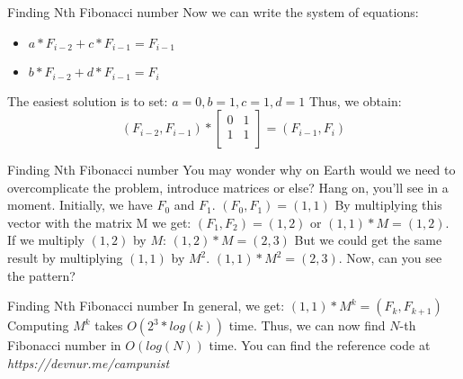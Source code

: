 \documentclass{beamer}
\begin{document}
\begin{frame}{Finding Nth Fibonacci number}
  Now we can write the system of equations:
  \begin{itemize}
    \item 
      $a * F_{i-2} + c * F_{i-1} = F_{i-1}$
    \item
      $b * F_{i-2} + d * F_{i-1} = F_i$
  \end{itemize}
  \pause
  The easiest solution is to set:
  \newline
  $a = 0, b = 1, c = 1, d = 1$
  \pause \newline
  Thus, we obtain:
  \[
    (F_{i-2}, F_{i-1})
    *
    \left[ {
      \begin{array}{cc}
        0 & 1 \\
        1 & 1 \\      
      \end{array} } 
    \right]
    = (F_{i-1}, F_i)
  \]
\end{frame}

\begin{frame}{Finding Nth Fibonacci number}
  You may wonder why on Earth would we need to overcomplicate the problem, introduce matrices or else?
  \newline Hang on, you'll see in a moment.
  \pause \newline
  Initially, we have $F_0$ and $F_1$.
  \newline
  $(F_0, F_1) = (1, 1)$
  \pause \newline
  By multiplying this vector with the matrix M we get:
  \newline
  $(F_1, F_2) = (1, 2)$ or $(1, 1) * M = (1, 2)$.
  \pause \newline
  If we multiply $(1, 2)$ by $M$:
  \newline
  $(1, 2) * M = (2, 3)$
  \pause \newline
  But we could get the same result by multiplying $(1, 1)$ by $M^2$.
  \newline
  $(1, 1) * M^2 = (2, 3)$.
  \pause \newline Now, can you see the pattern?
\end{frame}

\begin{frame}{Finding Nth Fibonacci number}
  In general, we get:
  \newline
  $(1, 1) * M^k = (F_k, F_{k+1})$
  \pause \newline
  Computing $M^k$ takes $O(2^3 * log(k))$ time. 
  \newline
  Thus, we can now find $N$-th Fibonacci number in $O(log(N))$ time.
  \pause \newline \newline
  You can find the reference code at \textit{https://devnur.me/campunist}
\end{frame}
\end{document}
